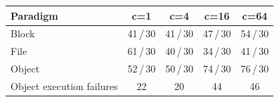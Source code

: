 \begin{tabular}{lcccc}
\toprule
Paradigm & c=1 & c=4 & c=16 & c=64 \\
\midrule
Block & 41\,/\,30 & 41\,/\,30 & 47\,/\,30 & 54\,/\,30 \\
File & 61\,/\,30 & 40\,/\,30 & 34\,/\,30 & 41\,/\,30 \\
Object & 52\,/\,30 & 50\,/\,30 & 74\,/\,30 & 76\,/\,30 \\
\midrule
Object execution failures & 22 & 20 & 44 & 46 \\
\bottomrule
\end{tabular}
